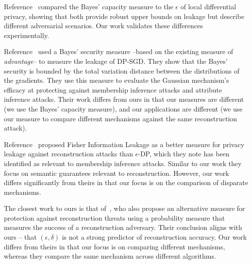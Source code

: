  Reference~\citet{fernandes2022explaining} compared the Bayes' capacity measure to the $\epsilon$ of local differential privacy, showing that both provide robust upper bounds on leakage but describe different adversarial scenarios. Our work validates these differences experimentally.

Reference~\citet{cherubinclosed} used a Bayes' security measure --based on the existing measure of \emph{advantage}-- to measure the leakage of DP-SGD. They show that the Bayes' security is bounded by the total variation distance between the distributions of the gradients. They use this measure to evaluate the Gaussian mechanism's efficacy at protecting against membership inference attacks and attribute inference attacks. Their work differs from ours in that our measures are different (we use the Bayes' capacity measure), and our applications are different (we use our measure to compare different mechanisms against the same reconstruction attack).

Reference~\citet{guo2022bounding} proposed Fisher Information Leakage as a better measure for privacy leakage against reconstruction attacks than $\epsilon$-DP, which they note has been identified as relevant to membership inference attacks. Similar to our work they focus on semantic guarantees relevant to reconstruction. However, our work differs significantly from theirs in that our focus is on the comparison of disparate mechanisms. 


The closest work to ours is that of~\citet{hayes2023bounding}, who also propose an alternative measure for protection against reconstruction threats using a probability measure that measures the success of a reconstruction adversary. Their conclusion aligns with ours -- that $(\epsilon, \delta)$ is not a strong predictor of reconstruction accuracy. Our work differs from theirs in that our focus is on comparing different mechanisms, whereas they compare the same mechanism across different algorithms.